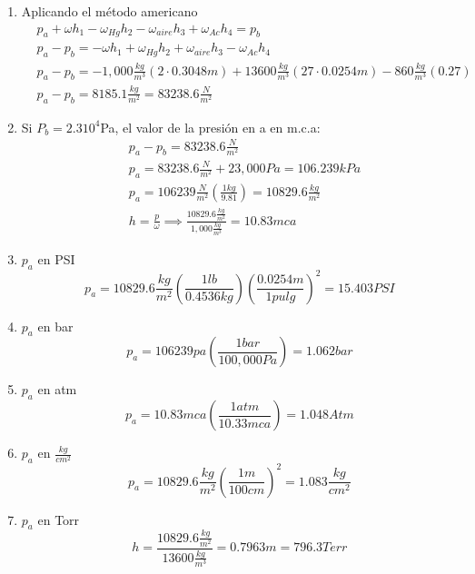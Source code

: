 \begin{enumerate}
    \item Aplicando el método americano
    \begin{align*}
        &p_a+\omega h_1-\omega_{Hg}h_2-\omega_{aire}h_3+\omega_{Ac}h_4=p_b\\
        &p_a-p_b=-\omega h_1+\omega_{Hg}h_2+\omega_{aire}h_3-\omega_{Ac}h_4\\
        &p_a-p_b=-1,000\frac{kg}{m^3}\left(2\cdot 0.3048m\right)+13600\frac{kg}{m^3}\left(27\cdot 0.0254m\right)-860 \frac{kg}{m^3}(0.27)\\
        &p_a-p_b=8185.1 \frac{kg}{m^2}=83238.6 \frac{N}{m^2}
    \end{align*}
    \item Si $P_b=2.310^4$Pa, el valor de la presión en a en m.c.a:
    \begin{align*}
        &p_a-p_b=83238.6\frac{N}{m^2}\\
        &p_a=83238.6\frac{N}{m^2}+23,000Pa=106.239kPa\\
        &p_a=106239\frac{N}{m^2}\left(\frac{1kg}{9.81}\right)=10829.6\frac{kg}{m^2}\\
        &h=\frac{p}{\omega}\implies \frac{10829.6\frac{kg}{m^2}}{1,000\frac{kg}{m^3}}=10.83mca
    \end{align*}
    \item $p_a$ en PSI
    \begin{equation*}
        p_a=10829.6\frac{kg}{m^2}\left(\frac{1lb}{0.4536kg}\right)\left(\frac{0.0254m}{1pulg}\right)^2=15.403PSI
    \end{equation*}
    \item $p_a$ en bar
    \begin{equation*}
        p_a=106239pa\left(\frac{1bar}{100,000Pa}\right)=1.062bar
    \end{equation*}
    \item $p_a$ en atm
    \begin{equation*}
        p_a=10.83mca\left(\frac{1atm}{10.33mca}\right)=1.048Atm
    \end{equation*}
    \item $p_a$ en $\frac{kg}{cm^2}$
    \begin{equation*}
        p_a=10829.6\frac{kg}{m^2}\left(\frac{1m}{100cm}\right)^2=1.083\frac{kg}{cm^2}
    \end{equation*}
    \item $p_a$ en Torr
    \begin{equation*}
        h=\frac{10829.6\frac{kg}{m^2}}{13600\frac{kg}{m^3}}=0.7963m=796.3Terr
    \end{equation*}
\end{enumerate}

